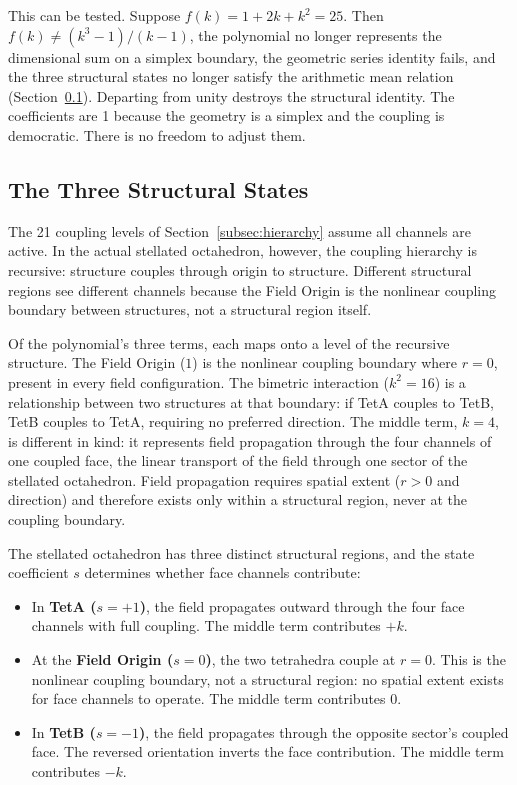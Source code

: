 \documentclass[aps,prd,preprint,superscriptaddress,showpacs,preprintnumbers,amsmath,amssymb,nofootinbib]{revtex4-2}
\begin{document}
This can be tested. Suppose $f(k) = 1 + 2k + k^2 = 25$. Then $f(k) \neq (k^3 - 1)/(k - 1)$, the polynomial no longer represents the dimensional sum on a simplex boundary, the geometric series identity fails, and the three structural states no longer satisfy the arithmetic mean relation (Section~\ref{subsec:states}). Departing from unity destroys the structural identity. The coefficients are 1 because the geometry is a simplex and the coupling is democratic. There is no freedom to adjust them.

\subsection{The Three Structural States}
\label{subsec:states}

The 21 coupling levels of Section~\ref{subsec:hierarchy} assume all channels are active. In the actual stellated octahedron, however, the coupling hierarchy is recursive: structure couples through origin to structure. Different structural regions see different channels because the Field Origin is the nonlinear coupling boundary between structures, not a structural region itself.

Of the polynomial's three terms, each maps onto a level of the recursive structure. The Field Origin ($1$) is the nonlinear coupling boundary where $r = 0$, present in every field configuration. The bimetric interaction ($k^2 = 16$) is a relationship between two structures at that boundary: if TetA couples to TetB, TetB couples to TetA, requiring no preferred direction. The middle term, $k = 4$, is different in kind: it represents field propagation through the four channels of one coupled face, the linear transport of the field through one sector of the stellated octahedron. Field propagation requires spatial extent ($r > 0$ and direction) and therefore exists only within a structural region, never at the coupling boundary.

The stellated octahedron has three distinct structural regions, and the state coefficient $s$ determines whether face channels contribute:

\begin{itemize}
\item In \textbf{TetA ($s = +1$)}, the field propagates outward through the four face channels with full coupling. The middle term contributes $+k$.
\item At the \textbf{Field Origin ($s = 0$)}, the two tetrahedra couple at $r = 0$. This is the nonlinear coupling boundary, not a structural region: no spatial extent exists for face channels to operate. The middle term contributes $0$.
\item In \textbf{TetB ($s = -1$)}, the field propagates through the opposite sector's coupled face. The reversed orientation inverts the face contribution. The middle term contributes $-k$.
\end{itemize}
\end{document}
